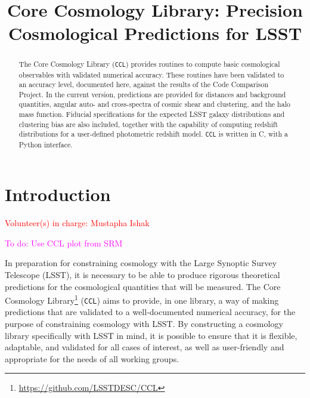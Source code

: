 \documentclass[\docopts]{\docclass}
\newcommand{\todo}[1]{\textcolor{magenta}{To do: #1}}
\newcommand{\vol}[1]{\textcolor{red}{Volunteer(s) in charge: #1}}
\newcommand{\ccl}{{\tt CCL}\xspace}
\begin{document}
\title{Core Cosmology Library: Precision Cosmological Predictions for LSST}

\maketitlepre

\begin{abstract}

The Core Cosmology Library (\ccl) provides routines to compute basic cosmological observables with validated numerical accuracy. These routines have been validated to an accuracy level, documented here, against the results of the Code Comparison Project. In the current version, predictions are provided for distances and background quantities, angular auto- and cross-spectra of cosmic shear and clustering, and the halo mass function. Fiducial specifications for the expected LSST galaxy distributions and clustering bias are also included, together with the capability of computing redshift distributions for a user-defined photometric redshift model. \ccl is written in C, with a Python interface.

\end{abstract}


\maketitlepost

\newpage
\tableofcontents{}
\newpage



\section{Introduction}
\label{sec:intro}
\vol{Mustapha Ishak}

\todo{Use CCL plot from SRM}

In preparation for constraining cosmology with the Large Synoptic Survey Telescope (LSST), it is necessary to be able to produce rigorous theoretical predictions for the cosmological quantities that will be measured. The Core Cosmology Library\footnote{\url{https://github.com/LSSTDESC/CCL}} (\ccl) aims to provide, in one library, a way of making predictions that are validated to a well-documented numerical accuracy, for the purpose of constraining cosmology with LSST. By constructing a cosmology library specifically with LSST in mind, it is possible to ensure that it is flexible, adaptable, and validated for all cases of interest, as well as user-friendly and appropriate for the needs of all working groups.
\end{document}

